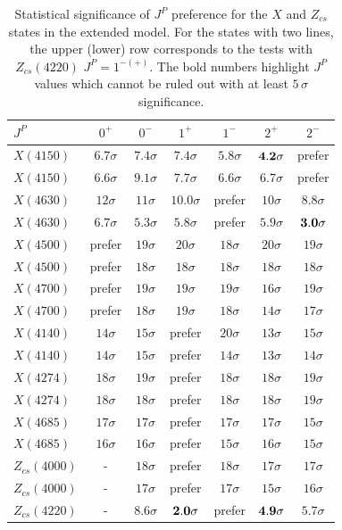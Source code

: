 \begin{table}[htbp]
\centering
\caption{Statistical significance of $J^P$ preference for the $X$ and $Z_{cs}$ states in the extended model.
For the states with two lines, the upper (lower) row corresponds to the tests with $Z_{cs}(4220)$ $J^P=1^{-(+)}$. 
The bold numbers highlight $J^P$ values which cannot be ruled out with at least $5\,\sigma$ significance.
}\label{tab:jpextend}
\begin{tabular}{lcccccc}\hline
$J^P$ & $0^{+}$& $0^{-}$ & $1^{+}$ & $1^{-}$ & $2^{+}$& $2^{-}$ \\ \hline
 $ X(4150) $ &$   6.7 \sigma$ &$   7.4 \sigma$ &$   7.4 \sigma$ &$   5.8 \sigma$ &$   \bf 4.2 \sigma$ &prefer\\
  $ X(4150) $ &$   6.6 \sigma$ &$   9.1 \sigma$ &$   7.7 \sigma$ &$   6.6 \sigma$ &$   6.7 \sigma$ &prefer\\
\hline
 $ X(4630) $ &$  12 \sigma$ &$  11 \sigma$ &$  10.0 \sigma$ &prefer&$  10 \sigma$ &$   8.8 \sigma$ \\
  $ X(4630) $ &$   6.7 \sigma$ &$   5.3 \sigma$ &$   5.8 \sigma$ &prefer&$   5.9 \sigma$ &$  \bf 3.0 \sigma$ \\
\hline
 $ X(4500) $ &prefer&$  19 \sigma$ &$  20 \sigma$ &$  18 \sigma$ &$  20 \sigma$ &$  19 \sigma$ \\
  $ X(4500) $ &prefer&$  18 \sigma$ &$  18 \sigma$ &$  18 \sigma$ &$  18 \sigma$ &$  18 \sigma$ \\
\hline
 $ X(4700) $ &prefer&$  19 \sigma$ &$  19 \sigma$ &$  19 \sigma$ &$  16 \sigma$ &$  19 \sigma$ \\
  $ X(4700) $ &prefer&$  18 \sigma$ &$  19 \sigma$ &$  18 \sigma$ &$  14 \sigma$ &$  17 \sigma$ \\
\hline
 $ X(4140) $ &$  14 \sigma$ &$  15 \sigma$ &prefer&$  20 \sigma$ &$  13 \sigma$ &$  15 \sigma$ \\
  $ X(4140) $ &$  14 \sigma$ &$  15 \sigma$ &prefer&$  14 \sigma$ &$  13 \sigma$ &$  14 \sigma$ \\
\hline
 $ X(4274) $ &$  18 \sigma$ &$  19 \sigma$ &prefer&$  18 \sigma$ &$  18 \sigma$ &$  19 \sigma$ \\
  $ X(4274) $ &$  18 \sigma$ &$  18 \sigma$ &prefer&$  18 \sigma$ &$  18 \sigma$ &$  19 \sigma$ \\
\hline
 $ X(4685) $ &$  17 \sigma$ &$  17 \sigma$ &prefer&$  17 \sigma$ &$  17 \sigma$ &$  15 \sigma$ \\
  $ X(4685) $ &$  16 \sigma$ &$  16 \sigma$ &prefer&$  15 \sigma$ &$  16 \sigma$ &$  15 \sigma$ \\
\hline
 $ Z_{cs}(4000) $ &- &$  18 \sigma$ &prefer&$  18 \sigma$ &$  17 \sigma$ &$  17 \sigma$ \\
 $ Z_{cs}(4000) $ &- &$  17 \sigma$ &prefer&$  17 \sigma$ &$  15 \sigma$ &$  16 \sigma$ \\
\hline
 $ Z_{cs}(4220) $ &- &$   8.6 \sigma$ &$   \bf 2.0 \sigma$ &prefer&$  \bf 4.9 \sigma$ &$   5.7 \sigma$ \\

\hline
\end{tabular}
\end{table}



